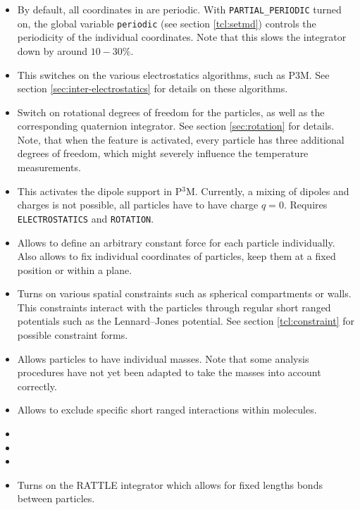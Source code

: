 \begin{itemize}
\item {} By default, all coordinates in \es{}
  are periodic. With \texttt{PARTIAL\_PERIODIC} turned on, the \es{}
  global variable \texttt{periodic} (see section \vref{tcl:setmd})
  controls the periodicity of the individual coordinates. Note that
  this slows the integrator down by around $10-30\%$.
\item {} This switches on the various
  electrostatics algorithms, such as P3M. See section
  \vref{sec:inter-electrostatics} for details on these algorithms.
\item {} Switch on rotational degrees of freedom for
  the particles, as well as the corresponding quaternion integrator.
  See section \vref{sec:rotation} for details. Note, that when the
  feature is activated, every particle has three additional degrees of
  freedom, which might severely influence the temperature
  measurements.
\item {} This activates the dipole support in P$^3$M.
  Currently, a mixing of dipoles and charges is not possible, \ie all
  particles have to have charge $q=0$.  Requires
  \texttt{ELECTROSTATICS} and \texttt{ROTATION}.
\item {} Allows to define an arbitrary
  constant force for each particle individually. Also allows to fix
  individual coordinates of particles, \eg keep them at a fixed
  position or within a plane.
\item {} Turns on various spatial constraints such
  as spherical compartments or walls. This constraints interact with
  the particles through regular short ranged potentials such as the
  Lennard--Jones potential. See section \vref{tcl:constraint} for
  possible constraint forms.
\item {} Allows particles to have individual masses. Note
  that some analysis procedures have not yet been adapted to take the
  masses into account correctly.
\item {} Allows to exclude specific short ranged
  interactions within molecules.
\item {} 
\item {} 
\item {} 
\item {} Turns on the RATTLE integrator which
  allows for fixed lengths bonds between particles. 
\end{itemize}

